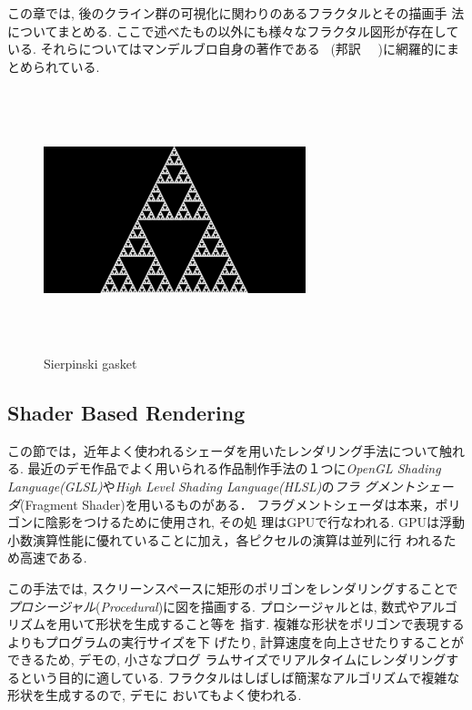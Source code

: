  この章では, 後のクライン群の可視化に関わりのあるフラクタルとその描画手
 法についてまとめる.
 ここで述べたもの以外にも様々なフラクタル図形が存在している.
 それらについてはマンデルブロ自身の著作である~\cite{mandelbrot1983fractal}
(邦訳~\cite{mandelbrot-ja-201102-1}
~\cite{mandelbrot-ja-201102-2})に網羅的にまとめられている.

\begin{figure}[htbp]
 \center
 \includegraphics[width=3in, height=3in, keepaspectratio]{../img/fractal/gasket.pdf}
 \caption{Sierpinski gasket}
 \label{fig:gasket}
\end{figure}

\subsection{Shader Based Rendering}

この節では，近年よく使われるシェーダを用いたレンダリング手法について触れる.
最近のデモ作品でよく用いられる作品制作手法の１つに\textit{OpenGL Shading
Language(GLSL)}や\textit{High Level Shading Language(HLSL)}の\emph{フラ
グメントシェーダ}(Fragment Shader)を用いるものがある．
フラグメントシェーダは本来，ポリゴンに陰影をつけるために使用され, その処
理はGPUで行なわれる.
GPUは浮動小数演算性能に優れていることに加え，各ピクセルの演算は並列に行
われるため高速である.

この手法では, スクリーンスペースに矩形のポリゴンをレンダリングすることで
\emph{プロシージャル}(\textit{Procedural})に図を描画する.
プロシージャルとは, 数式やアルゴリズムを用いて形状を生成すること等を
指す.
複雑な形状をポリゴンで表現するよりもプログラムの実行サイズを下
げたり, 計算速度を向上させたりすることができるため, デモの, 小さなプログ
ラムサイズでリアルタイムにレンダリングするという目的に適している.
フラクタルはしばしば簡潔なアルゴリズムで複雑な形状を生成するので, デモに
おいてもよく使われる.

